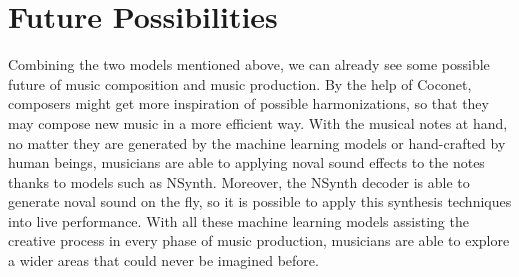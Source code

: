 \documentclass[jou]{apa6}
\begin{document}
\section{Future Possibilities}

Combining the two models mentioned above, we can already see some possible future of music composition and music production. By the help of Coconet, composers might get more inspiration of possible harmonizations, so that they may compose new music in a more efficient way. With the musical notes at hand, no matter they are generated by the machine learning models or hand-crafted by human beings, musicians are able to applying noval sound effects to the notes thanks to models such as NSynth. Moreover, the NSynth decoder is able to generate noval sound on the fly, so it is possible to apply this synthesis techniques into live performance. With all these machine learning models assisting the creative process in every phase of music production, musicians are able to explore a wider areas that could never be imagined before.

\printbibliography
\end{document}
